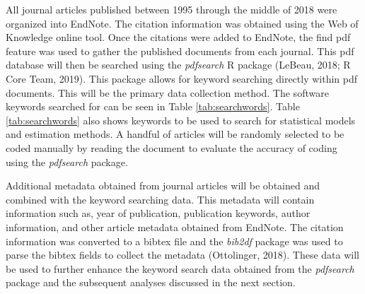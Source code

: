 \documentclass[english,,man]{apa6}
\begin{document}
All journal articles published between 1995 through the middle of 2018 were organized into EndNote. The citation information was obtained using the Web of Knowledge online tool. Once the citations were added to EndNote, the find pdf feature was used to gather the published documents from each journal. This pdf database will then be searched using the \emph{pdfsearch} R package (LeBeau, 2018; R Core Team, 2019). This package allows for keyword searching directly within pdf documents. This will be the primary data collection method. The software keywords searched for can be seen in Table \ref{tab:searchwords}. Table \ref{tab:searchwords} also shows keywords to be used to search for statistical models and estimation methods. A handful of articles will be randomly selected to be coded manually by reading the document to evaluate the accuracy of coding using the \emph{pdfsearch} package.

Additional metadata obtained from journal articles will be obtained and combined with the keyword searching data. This metadata will contain information such as, year of publication, publication keywords, author information, and other article metadata obtained from EndNote. The citation information was converted to a bibtex file and the \emph{bib2df} package was used to parse the bibtex fields to collect the metadata (Ottolinger, 2018). These data will be used to further enhance the keyword search data obtained from the \emph{pdfsearch} package and the subsequent analyses discussed in the next section.
\end{document}
